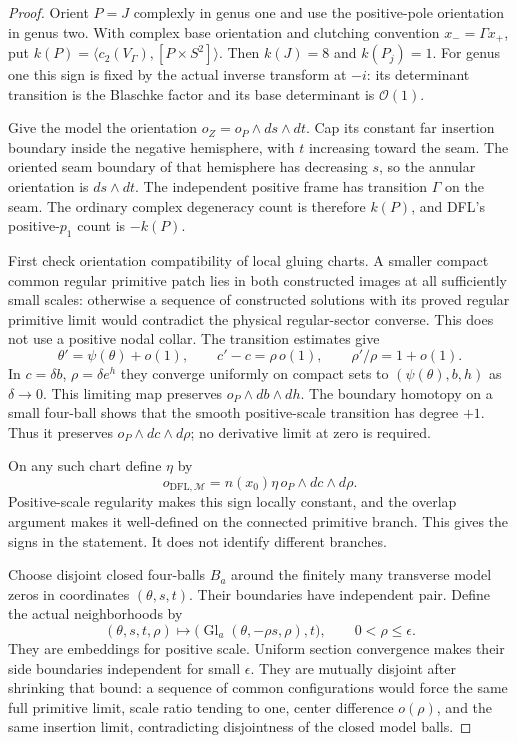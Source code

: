 \documentclass[11pt]{amsart}
\theoremstyle{definition}
\theoremstyle{remark}
\theoremstyle{plain}
\begin{document}
\begin{proof}
Orient $P=J$ complexly in genus one and use the positive-pole
orientation in genus two. With complex base orientation and
clutching convention $x_-=\Gamma x_+$, put
$k(P)=\langle c_2(V_\Gamma),[P\times S^2]\rangle$.
Then $k(J)=8$ and $k(P_j)=1$. For genus one this sign is
fixed by the actual inverse transform at $-i$: its determinant
transition is the Blaschke factor and its base determinant is
$\mathcal O(1)$.

Give the model the orientation $o_Z=o_P\wedge ds\wedge dt$.
Cap its constant far insertion boundary inside the negative
hemisphere, with $t$ increasing toward the seam. The oriented
seam boundary of that hemisphere has decreasing $s$, so the
annular orientation is $ds\wedge dt$. The independent positive
frame has transition $\Gamma$ on the seam. The ordinary
complex degeneracy count is therefore $k(P)$, and DFL's
positive-$p_1$ count is $-k(P)$.

First check orientation compatibility of local gluing charts.
A smaller compact common regular primitive patch lies in both
constructed images at all sufficiently small scales: otherwise
a sequence of constructed solutions with its proved regular
primitive limit would contradict the physical regular-sector
converse. This does not use a positive nodal collar.
The transition estimates give
\[
 \theta'=\psi(\theta)+o(1),\qquad
 c'-c=\rho\,o(1),\qquad \rho'/\rho=1+o(1).
\]
In $c=\delta b$, $\rho=\delta e^h$ they converge uniformly
on compact sets to $(\psi(\theta),b,h)$ as $\delta\to0$.
This limiting map preserves $o_P\wedge db\wedge dh$.
The boundary homotopy on a small four-ball shows that the
smooth positive-scale transition has degree $+1$.
Thus it preserves $o_P\wedge dc\wedge d\rho$; no derivative
limit at zero is required.

On any such chart define $\eta$ by
\begin{equation}\label{eq:finite-center-orientation-sign}
 o_{\mathrm{DFL},\mathcal M}
       =n(x_0)\eta\,o_P\wedge dc\wedge d\rho.
\end{equation}
Positive-scale regularity makes this sign locally constant,
and the overlap argument makes it well-defined on the
connected primitive branch. This gives the signs in the
statement. It does not identify different branches.

Choose disjoint closed four-balls $B_a$ around the finitely
many transverse model zeros in coordinates $(\theta,s,t)$.
Their boundaries have independent pair. Define the actual
neighborhoods by
\[
 (\theta,s,t,\rho)\longmapsto
          \bigl(\operatorname{Gl}_a(\theta,-\rho s,\rho),t\bigr),
                      \qquad 0<\rho\leq\epsilon.
\]
They are embeddings for positive scale. Uniform section
convergence makes their side boundaries independent for
small $\epsilon$. They are mutually disjoint after shrinking
that bound: a sequence of common configurations would force
the same full primitive limit, scale ratio tending to one,
center difference $o(\rho)$, and the same insertion limit,
contradicting disjointness of the closed model balls.


\end{proof}
\end{document}
